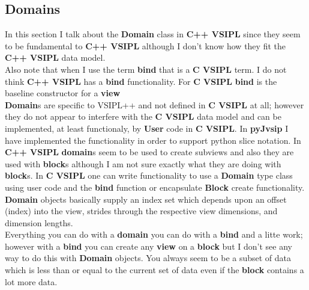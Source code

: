 \documentclass[11pt, oneside]{article}
\newcommand{\cvl}{\ttbf{C VSIPL}}
\newcommand{\cvpp}{\ttbf{C++ VSIPL}}
\newcommand{\pyjv}{{\ttbf{pyJvsip}}}
\newcommand{\ttbf}[1]{{\ttfamily \bfseries #1}}
\newcommand{\blk}{\ttbf{block}}
\newcommand{\vw}{\ttbf{view}}
\begin{document}
\subsection{Domains}
In this section I talk about the \ttbf{Domain} class in \cvpp{} since they seem to be fundamental to \cvpp{} although I don't know how they fit the \cvpp{} data model. 
\\[6pt]
Also note that when I use the term \ttbf{bind} that is a \cvl{} term.  I do not think \cvpp{} has a \ttbf{bind} functionality.  For \cvl{} \ttbf{bind} is the baseline constructor for a \vw{} 
\\[6pt]
\ttbf{Domain}s are specific to VSIPL++ and not defined in \cvl{} at all; however they do not appear to interfere with the \cvl{}  data model and can be implemented, at least functionaly, by \ttbf{User} code in \cvl{}. In \pyjv{} I have implemented the functionality in order to support python slice notation.  In \cvpp{} \ttbf{domain}s seem to be used to create subviews and also they are used with \blk{}s  although I am not sure exactly what they are doing with \ttbf{block}s. In \cvl{} one can write functionality to use a \ttbf{Domain} type class using user code and the \ttbf{bind} function or encapsulate \ttbf{Block} create functionality.  \ttbf{Domain} objects basically supply an index set which depends upon an offset (index) into the view, strides through the respective view dimensions, and dimension lengths.
\\[6pt]
Everything you can do with a \ttbf{domain} you can do with a \ttbf{bind} and a litte work; however with a \ttbf{bind} you can create any \vw{} on a \blk{} but I don't see any way to do this with \ttbf{Domain} objects.  You always seem to be a subset of data which is less than or equal to the current set of data even if the \blk{} contains a lot more data.
\end{document}
